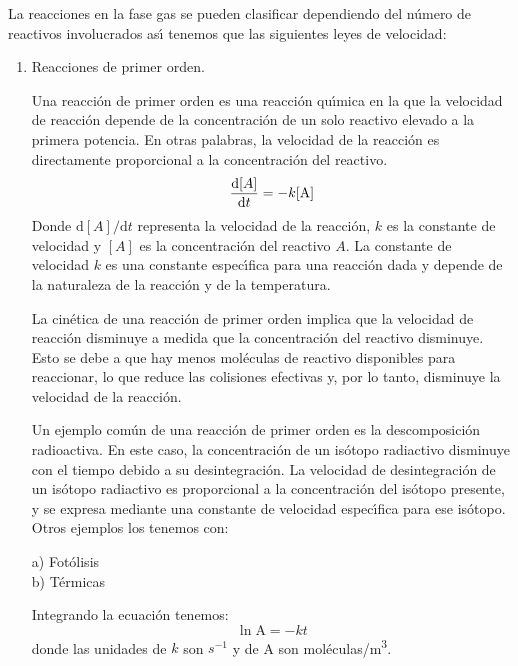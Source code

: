 La reacciones en la fase gas se pueden clasificar dependiendo del n\'umero de reactivos involucrados as\'{\i} tenemos que las siguientes leyes de velocidad:
\begin{enumerate}
\item Reacciones de primer orden.

Una reacci\'on de primer orden es una reacci\'on qu\'{\i}mica en la que la velocidad de reacci\'on depende de la concentraci\'on de un solo reactivo elevado a la primera potencia. En otras palabras, la velocidad de la reacci\'on es directamente proporcional a la concentraci\'on del reactivo.
	 \begin{equation*}
	\frac{\mathrm{d}\textrm[A]}{\mathrm{d}t}=-k[\textrm{A}]
	\end{equation*}
Donde $\mathrm{d}[A]/\mathrm{d}t$ representa la velocidad de la reacci\'on, $k$ es la constante de velocidad y $[A]$ es la concentraci\'on del reactivo $A$. La constante de velocidad $k$ es una constante espec\'{\i}fica para una reacci\'on dada y depende de la naturaleza de la reacci\'on y de la temperatura.

La cin\'etica de una reacci\'on de primer orden implica que la velocidad de reacci\'on disminuye a medida que la concentraci\'on del reactivo disminuye. Esto se debe a que hay menos mol\'eculas de reactivo disponibles para reaccionar, lo que reduce las colisiones efectivas y, por lo tanto, disminuye la velocidad de la reacci\'on.

Un ejemplo com\'un de una reacci\'on de primer orden es la descomposici\'on radioactiva. En este caso, la concentraci\'on de un is\'otopo radiactivo disminuye con el tiempo debido a su desintegraci\'on. La velocidad de desintegraci\'on de un is\'otopo radiactivo es proporcional a la concentraci\'on del is\'otopo presente, y se expresa mediante una constante de velocidad espec\'{\i}fica para ese is\'otopo. Otros ejemplos los tenemos con:
	\begin{description}
		\item[a) Fot\'olisis]  
		\item[b) T\'ermicas] 
	\end{description}
Integrando la ecuaci\'on tenemos:
	\begin{equation*}
	\ln \textrm{A} = -kt
	\end{equation*}
	donde las unidades de $k$ son $s^{-1}$ y de A  son mol\'eculas/\si{\cubic\metre}.
	

\end{enumerate}
